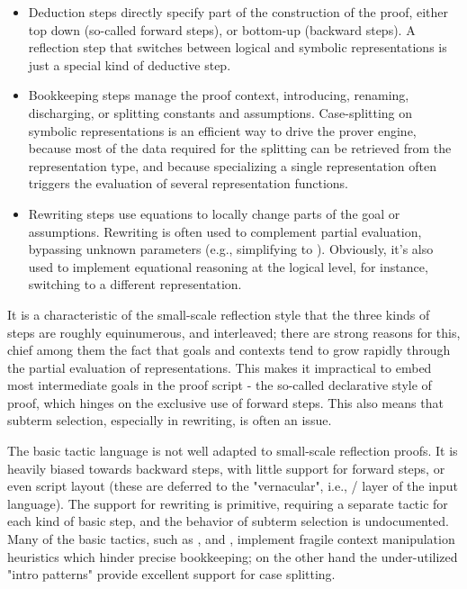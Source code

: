 \begin{itemize}
\item Deduction steps directly specify part of the construction of
the proof, either top down (so-called forward steps), or bottom-up
(backward steps). A reflection step that switches between logical and
symbolic representations is just a special kind of deductive step.
\item
Bookkeeping steps manage the proof context, introducing, renaming,
discharging, or splitting constants and assumptions. Case-splitting on
symbolic representations is an efficient way to drive the prover
engine, because most of the data required for the splitting can be
retrieved from the representation type, and because specializing a
single representation often triggers the evaluation of several
representation functions.
\item Rewriting steps use equations to locally
change parts of the goal or assumptions.  Rewriting is often used to
complement partial evaluation, bypassing unknown parameters (e.g.,
simplifying  to ). Obviously, it's also used to
implement equational reasoning at the logical level, for instance,
switching to a different representation.
\end{itemize}

It is a characteristic of the
small-scale reflection style that the three kinds of steps are roughly
equinumerous, and interleaved; there are strong reasons for this,
chief among them the fact that goals and contexts tend to grow rapidly
through the partial evaluation of representations.  This makes it
impractical to embed most intermediate goals in the proof script - the
so-called declarative style of proof, which hinges on the exclusive
use of forward steps. This also means that subterm selection,
especially in rewriting, is often an issue.

The basic \Coq{} tactic language is not well adapted to small-scale
reflection proofs. It is heavily biased towards backward steps, with
little support for forward steps, or even script layout (these are
deferred to the "vernacular", i.e., / layer of
the input language). The support for rewriting is primitive, requiring
a separate tactic for each kind of basic step, and the behavior of
subterm selection is undocumented. Many of the basic tactics, such as
,  and , implement fragile context
manipulation heuristics which hinder precise bookkeeping; on the other
hand the under-utilized "intro patterns" provide excellent support for
case splitting.

